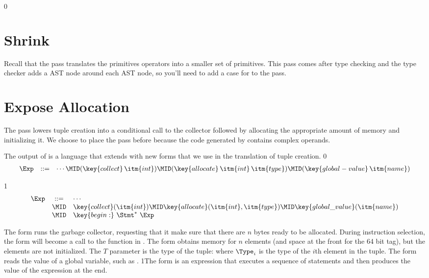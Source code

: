 \documentclass[7x10]{TimesAPriori_MIT}%
\def\racketEd{0}
\def\pythonEd{1}
\def\edition{1}
\newcommand{\racket}[1]{{\if\edition\racketEd{#1}\fi}}
\newcommand{\python}[1]{{\if\edition\pythonEd #1\fi}}
\begin{document}
{\if\edition\racketEd
\section{Shrink}
\label{sec:shrink-Lvec}

Recall that the  pass translates the primitives operators
into a smaller set of primitives.
%
This pass comes after type checking and the type checker adds a
 AST node around each  AST node, so you'll
need to add a case for  to the  pass.

\fi}

\section{Expose Allocation}
\label{sec:expose-allocation}

The pass  lowers tuple creation into a
conditional call to the collector followed by allocating the
appropriate amount of memory and initializing it.  We choose to place
the  pass before
 because the code generated by
 contains complex operands.

The output of  is a language \LangAlloc{}
that extends \LangVec{} with new forms that we use in the translation
of tuple creation.
%
{\if\edition\racketEd
\[
\begin{array}{lcl}
  \Exp &::=& \cdots
      \MID (\key{collect} \,\itm{int})
      \MID (\key{allocate} \,\itm{int}\,\itm{type})
      \MID (\key{global-value} \,\itm{name}) 
\end{array}
\]
\fi}
{\if\edition\pythonEd
\[
\begin{array}{lcl}
  \Exp &::=& \cdots\\
      &\MID& \key{collect}(\itm{int})
      \MID \key{allocate}(\itm{int},\itm{type})
      \MID \key{global\_value}(\itm{name}) \\
      &\MID& \key{begin:} ~ \Stmt^{*} ~ \Exp
\end{array}
\]

\fi}

The  form runs the garbage collector, requesting that it
make sure that there are $n$ bytes ready to be allocated. During
instruction selection, the  form will become a call to
the  function in .
%
The  form obtains memory for $n$ elements (and
space at the front for the 64 bit tag), but the elements are not
initialized.   The $T$ parameter is the type
of the tuple:
%
\VECTY{\racket{$\Type_1 \ldots \Type_n$}\python{$\Type_1, \ldots, \Type_n$}}
%
where $\Type_i$ is the type of the $i$th element in the tuple. The
 form reads the value of a global variable, such
as .
%
\python{The  form is an expression that executes a
  sequence of statements and then produces the value of the expression
  at the end.}
\end{document}
